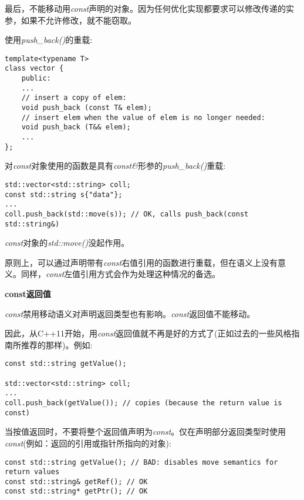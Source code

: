 最后，不能移动用\textit{const}声明的对象。因为任何优化实现都要求可以修改传递的实参，如果不允许修改，就不能窃取。\par

使用\textit{push\_back()}的重载:\par

\begin{lstlisting}[caption={}]
template<typename T>
class vector {
	public:
	...
	// insert a copy of elem:
	void push_back (const T& elem);
	// insert elem when the value of elem is no longer needed:
	void push_back (T&& elem);
	...
};
\end{lstlisting}

对\textit{const}对象使用的函数是具有\textit{const\&}形参的\textit{push\_back()}重载:\par

\begin{lstlisting}[caption={}]
std::vector<std::string> coll;
const std::string s{"data"};
...
coll.push_back(std::move(s)); // OK, calls push_back(const std::string&)
\end{lstlisting}

\textit{const}对象的\textit{std::move()}没起作用。\par

原则上，可以通过声明带有\textit{const}右值引用的函数进行重载，但在语义上没有意义。同样，\textit{const}左值引用方式会作为处理这种情况的备选。\par

\hspace*{\fill} \par %
\textbf{const返回值}

\textit{const}禁用移动语义对声明返回类型也有影响。\textit{const}返回值不能移动。\par

因此，从C++11开始，用\textit{const}返回值就不再是好的方式了(正如过去的一些风格指南所推荐的那样)。例如:\par

\begin{lstlisting}[caption={}]
const std::string getValue();

std::vector<std::string> coll;
...
coll.push_back(getValue()); // copies (because the return value is const)
\end{lstlisting}

当按值返回时，不要将整个返回值声明为\textit{const}。仅在声明部分返回类型时使用\textit{const}(例如：返回的引用或指针所指向的对象):\par

\begin{lstlisting}[caption={}]
const std::string getValue(); // BAD: disables move semantics for return values
const std::string& getRef(); // OK
const std::string* getPtr(); // OK
\end{lstlisting}






